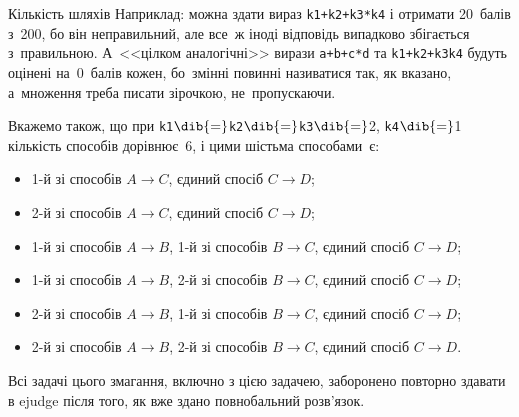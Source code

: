 {\begin{problemAllDefault}{Кількість шляхів}
Наприклад: можна здати вираз 
\verb"k1+k2+k3*k4"
і отримати 20~балів з~200, бо він неправильний,
але все~ж іноді відповідь випадково збігається з~правильною. 
А~<<цілком аналогічні>> вирази 
\verb"a+b+c*d"
та
\verb"k1+k2+k3k4"
будуть оцінені на~0~балів кожен, 
бо~змінні повинні називатися так, як вказано,
а~множення треба писати зірочкою, не~пропускаючи.

Вкажемо також, що при 
\texttt{k1}$\dib{{=}}$\texttt{k2}$\dib{{=}}$\texttt{k3}$\dib{{=}}$2, 
\texttt{k4}$\dib{{=}}$1
кількість способів дорівнює~6,
і цими шістьма способами~є:
\begin{itemize}
\item
\mbox{1-й} зі способів $A{\to}C$, єдиний спосіб $C{\to}D$;
\item
\mbox{2-й} зі способів $A{\to}C$, єдиний спосіб $C{\to}D$;
\item
\mbox{1-й} зі способів $A{\to}B$, \mbox{1-й} зі способів $B{\to}C$, єдиний спосіб $C{\to}D$;
\item
\mbox{1-й} зі способів $A{\to}B$, \mbox{2-й} зі способів $B{\to}C$, єдиний спосіб $C{\to}D$;
\item                                                        
\mbox{2-й} зі способів $A{\to}B$, \mbox{1-й} зі способів $B{\to}C$, єдиний спосіб $C{\to}D$;
\item                                                                 
\mbox{2-й} зі способів $A{\to}B$, \mbox{2-й} зі способів $B{\to}C$, єдиний спосіб $C{\to}D$.

\end{itemize}

\ifStatementOnly
\vfill\par
Всі задачі цього змагання, включно з цією задачею, заборонено повторно здавати в ejudge після того, як вже здано повнобальний розв'язок.
\fi

\end{problemAllDefault}

}